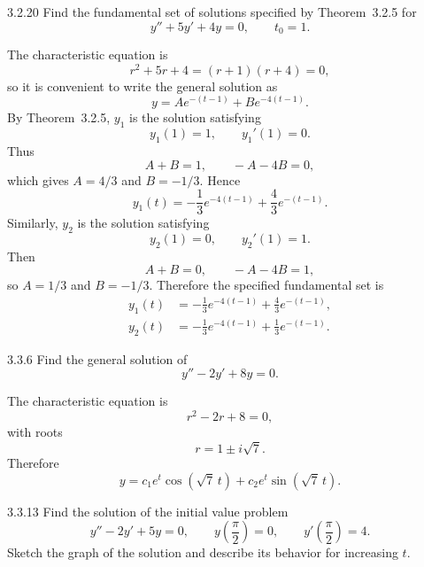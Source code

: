 \documentclass[11pt,oneside]{article}
\begin{document}
\begin{problem}{3.2.20}
Find the fundamental set of solutions specified by Theorem~3.2.5 for
\[
    y''+5y'+4y=0,
    \qquad
    t_0=1.
\]
\end{problem}

\begin{solution}
The characteristic equation is
\[
    r^2+5r+4=(r+1)(r+4)=0,
\]
so it is convenient to write the general solution as
\[
    y=Ae^{-(t-1)}+Be^{-4(t-1)}.
\]
By Theorem~3.2.5, $y_1$ is the solution satisfying
\[
    y_1(1)=1,
    \qquad
    y_1'(1)=0.
\]
Thus
\[
    A+B=1,
    \qquad
    -A-4B=0,
\]
which gives $A=4/3$ and $B=-1/3$. Hence
\[
    y_1(t)=-\frac13e^{-4(t-1)}+\frac43e^{-(t-1)}.
\]
Similarly, $y_2$ is the solution satisfying
\[
    y_2(1)=0,
    \qquad
    y_2'(1)=1.
\]
Then
\[
    A+B=0,
    \qquad
    -A-4B=1,
\]
so $A=1/3$ and $B=-1/3$. Therefore the specified fundamental set is
\[
    \boxed{
    \begin{aligned}
        y_1(t)&=-\frac13e^{-4(t-1)}+\frac43e^{-(t-1)},\\
        y_2(t)&=-\frac13e^{-4(t-1)}+\frac13e^{-(t-1)}.
    \end{aligned}}
\]
\end{solution}

\begin{problem}{3.3.6}
Find the general solution of
\[
    y''-2y'+8y=0.
\]
\end{problem}

\begin{solution}
The characteristic equation is
\[
    r^2-2r+8=0,
\]
with roots
\[
    r=1\pm i\sqrt7.
\]
Therefore
\[
    \boxed{
        y=c_1e^t\cos(\sqrt7\,t)
        +c_2e^t\sin(\sqrt7\,t)
    }.
\]
\end{solution}

\begin{problem}{3.3.13}
Find the solution of the initial value problem
\[
    y''-2y'+5y=0,
    \qquad
    y\left(\frac{\pi}{2}\right)=0,
    \qquad
    y'\left(\frac{\pi}{2}\right)=4.
\]
Sketch the graph of the solution and describe its behavior for increasing $t$.
\end{problem}
\end{document}
